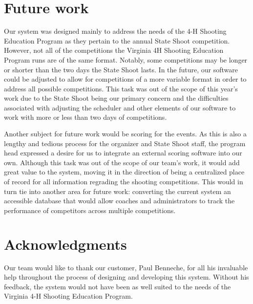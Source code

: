 \documentclass[sigconf]{acmart}
\begin{document}
\section{Future work}%
Our system was designed mainly to address the needs of the 4-H Shooting Education Program as they pertain to the annual State Shoot competition. However, not all of the competitions the Virginia 4H Shooting Education Program runs are of the same format. Notably, some competitions may be longer or shorter than the two days the State Shoot lasts. In the future, our software could be adjusted to allow for competitions of a more variable format in order to address all possible competitions. This task was out of the scope of this year's work due to the State Shoot being our primary concern and the difficulties associated with adjusting the scheduler and other elements of our software to work with more or less than two days of competitions. 

Another subject for future work would be scoring for the events. As this is also a lengthy and tedious process for the organizer and State Shoot staff, the program head expressed a desire for us to integrate an external scoring software into our own. Although this task was out of the scope of our team's work, it would add great value to the system, moving it in the direction of being a centralized place of record for all information regrading the shooting competitions. This would in turn tie into another area for future work: converting the current system an accessible database that would allow coaches and administrators to track the performance of competitors across multiple competitions. 

\section{Acknowledgments}%

Our team would like to thank our customer, Paul Benneche, for all his invaluable help throughout the process of designing and developing this system. Without his feedback, the system would not have been as well suited to the needs of the Virginia 4-H Shooting Education Program.

\end{document}
